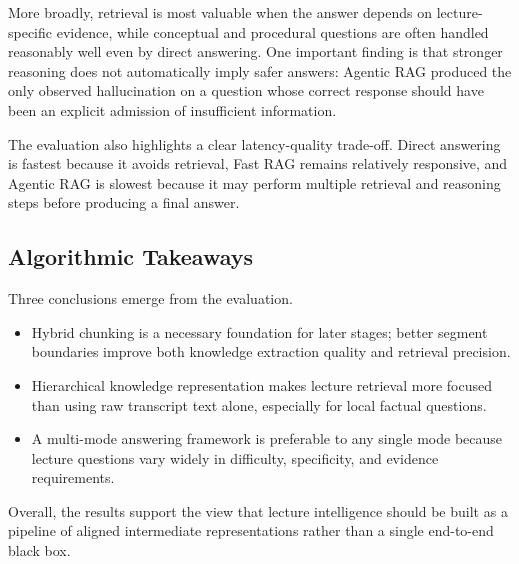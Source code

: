 More broadly, retrieval is most valuable when the answer depends on lecture-specific evidence, while conceptual and procedural questions are often handled reasonably well even by direct answering. One important finding is that stronger reasoning does not automatically imply safer answers: Agentic RAG produced the only observed hallucination on a question whose correct response should have been an explicit admission of insufficient information.

The evaluation also highlights a clear latency-quality trade-off. Direct answering is fastest because it avoids retrieval, Fast RAG remains relatively responsive, and Agentic RAG is slowest because it may perform multiple retrieval and reasoning steps before producing a final answer.

\subsection{Algorithmic Takeaways}

Three conclusions emerge from the evaluation.

\begin{itemize}
\item Hybrid chunking is a necessary foundation for later stages; better segment boundaries improve both knowledge extraction quality and retrieval precision.
\item Hierarchical knowledge representation makes lecture retrieval more focused than using raw transcript text alone, especially for local factual questions.
\item A multi-mode answering framework is preferable to any single mode because lecture questions vary widely in difficulty, specificity, and evidence requirements.
\end{itemize}

Overall, the results support the view that lecture intelligence should be built as a pipeline of aligned intermediate representations rather than a single end-to-end black box.
